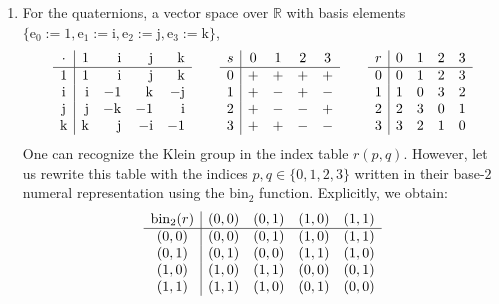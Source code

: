 \documentclass{article}
\begin{document}
\begin{enumerate}
\item For the quaternions, a vector space over $\mathbb{R}$ with basis elements $\{ \mathrm e_0 := 1, \mathrm e_1 := \mathrm i, \mathrm e_2 := \mathrm j, \mathrm e_3 := \mathrm k\}$,
$$ \begin{array}{c | r r r r}
     \cdot & 1 & \mathrm i & \mathrm j & \mathrm k \\
     \hline
     1 & 1 & \mathrm i & \mathrm j & \mathrm k \\
     \mathrm i & \mathrm i & -1 & \mathrm k & -\mathrm j \\
     \mathrm j & \mathrm j & -\mathrm k & -1 & \mathrm i \\
     \mathrm k & \mathrm k & \mathrm j & - \mathrm i & -1 \\
\end{array} \qquad \begin{array}{c | c c c c}
     s & 0 & 1 & 2 & 3 \\
     \hline
     0 & + & + & + & + \\
     1 & + & - & + & - \\
     2 & + & - & - & + \\
     3 & + & + & - & - \\
\end{array} 
\qquad
 \begin{array}{c | c c c c}
     r & 0 & 1 & 2 & 3 \\
     \hline
     0 & 0 & 1 & 2 & 3 \\
     1 & 1 & 0 & 3 & 2 \\
     2 & 2 & 3 & 0 & 1 \\
     3 & 3 & 2 & 1 & 0 \\
\end{array} $$
One can recognize the Klein group in the index table $r(p,q)$. However, let us rewrite this table with the indices $p,q\in \{0,1,2,3\}$ written in their base-$2$ numeral representation using the $\mathrm{bin}_2$ function. Explicitly, we obtain:
$$ \begin{array}{c | c c c c}
     \mathrm{bin}_2(r) & (0,0) & (0,1) & (1,0) & (1,1) \\
     \hline
     (0,0) & (0,0) & (0,1) & (1,0) & (1,1) \\
     (0,1) & (0,1) & (0,0) & (1,1) & (1,0) \\
     (1,0) & (1,0) & (1,1) & (0,0) & (0,1) \\
     (1,1) & (1,1) & (1,0) & (0,1) & (0,0) \\
\end{array} $$

\end{enumerate}
\end{document}
